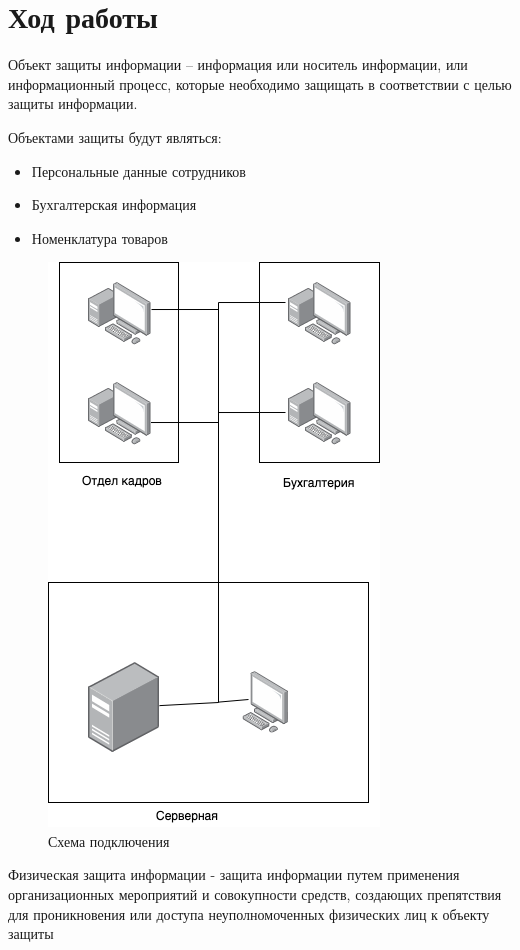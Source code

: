 \section{Ход работы}

Объект защиты информации\cite{GOST50922} – информация или носитель информации, или информационный процесс, которые необходимо защищать в соответствии с целью защиты информации.

Объектами защиты будут являться:

\begin{itemize}
	\item Персональные данные сотрудников
	\item Бухгалтерская информация
	\item Номенклатура товаров
\end{itemize}	

\begin{figure}[H]
	\centering
	\includegraphics[width=.3\textwidth]{img/market.png}
	\caption{Схема подключения}
\end{figure}

Физическая защита информации\cite{GOST50922} - защита информации путем применения организационных мероприятий и совокупности средств, создающих препятствия для проникновения или доступа неуполномоченных физических лиц к объекту защиты

